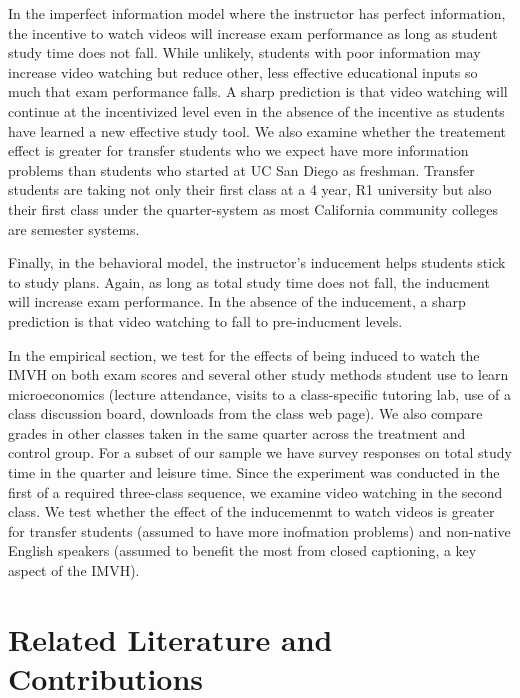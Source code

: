 \documentclass[12pt]{article}
\begin{document}
In the imperfect information model where the instructor has perfect information, the incentive to watch videos will increase exam performance as long as student study time does not fall.  While unlikely, students with poor information may increase video watching but reduce other, less effective educational inputs so much that exam performance falls. A sharp prediction is that video watching will continue at the incentivized level even in the absence of the incentive as students have learned a new effective study tool. We also examine whether the treatement effect is greater for transfer students who we expect have more information problems than students who started at UC San Diego as freshman.  Transfer students are taking not only their first class at a 4 year, R1 university but also their first class under the quarter-system as most California community colleges are semester systems.

Finally, in the behavioral model, the instructor's inducement helps students stick to study plans.  Again, as long as total study time does not fall, the inducment will increase exam performance.  In the absence of the inducement, a sharp prediction is that video watching to fall to pre-inducment levels.  

In the empirical section, we test for the effects of being induced to watch the IMVH on both exam scores and several other study methods student use to learn microeconomics (lecture attendance, visits to a class-specific tutoring lab, use of a class discussion board, downloads from the class web page).  We also compare grades in other classes taken in the same quarter across the treatment and control group.  For a subset of our sample we have survey responses on total study time in the quarter and leisure time.  Since the experiment was conducted in the first of a required three-class sequence, we examine video watching in the second class.  We test whether the effect of the inducemenmt to watch videos is greater for transfer students (assumed to have more inofmation problems) and non-native English speakers (assumed to benefit the most from closed captioning, a key aspect of the IMVH).   

\section{Related Literature and Contributions} \label{background}
\end{document}
